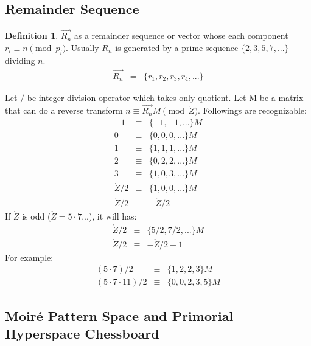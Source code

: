 \documentclass[twocolumn]{article}%
\newtheorem{lem}{Lemma}
\theoremstyle{definition}
\newtheorem{dfn}{Definition}
\theoremstyle{remark}
\begin{document}
\subsection*{Remainder Sequence}

\begin{dfn}
	$\overrightarrow{R_n}$ as a remainder sequence or vector whose each component $r_i\equiv n\pmod{p_i}$. Usually $R_n$ is generated by a prime sequence $\{2,3,5,7,...\}$ dividing $n$.
	\begin{eqnarray*}
		\overrightarrow{R_n}&=&\{r_1,r_2,r_3,r_4,...\}
	\end{eqnarray*}
\end{dfn}
Let $/$ be integer division operator which takes only quotient. Let M be a matrix that can do a reverse transform  $n\equiv\overrightarrow{R_n}M \pmod{\mathring{Z}}$. Followings are recognizable:	
\begin{eqnarray*}
	-1&\equiv&\{-1,-1,...\}M\\
	0&\equiv&\{0,0,0,...\}M\\
	1&\equiv&\{1,1,1,...\}M\\
	2&\equiv&\{0,2,2,...\}M\\
	3&\equiv&\{1,0,3,...\}M\\
	\mathring{Z}/2&\equiv&\{1,0,0,...\}M\\
	\mathring{Z}/2&\equiv&-\mathring{Z}/2
\end{eqnarray*}
If $\mathring{Z}$ is odd ($ \mathring{Z}=5\cdot7 ...$), it will has:
 \begin{eqnarray*}
 	\mathring{Z}/2 &\equiv&\{5/2,7/2,...\}M\\
 	\mathring{Z}/2&\equiv&-\mathring{Z}/2-1
 \end{eqnarray*}
For example:
\begin{eqnarray*}
	(5\cdot7)/2&\equiv&\{1,2,2,3\}M\\
	(5\cdot7\cdot11)/2&\equiv&\{0,0,2,3,5\}M
\end{eqnarray*}



\subsection*{Moiré Pattern Space and Primorial Hyperspace Chessboard}
\end{document}

